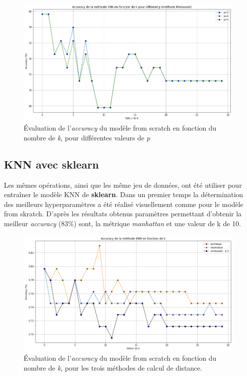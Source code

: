 \documentclass[french]{article}
\begin{document}
\begin{figure}[!htbp]
    \centering
    \includegraphics[width=\textwidth]{images/k_estimation_minkowki.png}
    \caption{Évaluation de l'\textit{accuracy} du modèle from scratch en fonction du nombre de \textit{k}, pour différentes valeurs de \textit{p}}
    \label{fig:KNN_min}
\end{figure}

\newpage

\subsection{KNN avec sklearn}

Les mêmes opérations, ainsi que les même jeu de données,  ont été utiliser pour entraîner le modèle KNN de \textbf{sklearn}. Dans un premier temps la détermination des meilleurs hyperparamètres a été réalisé visuellement comme pour le modèle from skratch. D'après les résultats obtenus paramètres permettant d'obtenir la meilleur \textit{accuracy} (83\%) sont, la métrique \textit{manhattan} et une valeur de k de 10.\\

\begin{figure}[!htbp]
    \centering
    \includegraphics[width=\textwidth]{images/k_estimation_sklearn.png}
    \caption{Évaluation de l'\textit{accuracy} du modèle from scratch en fonction du nombre de \textit{k}, pour les trois méthodes de calcul de distance.}
    \label{fig:KNN_sklearn}
\end{figure}
\end{document}
